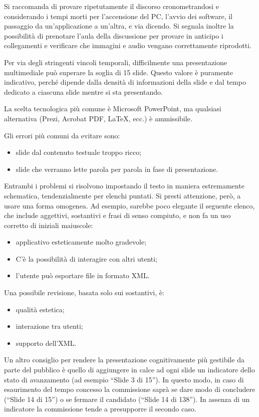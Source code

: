 Si raccomanda di provare ripetutamente il discorso cronometrandosi e considerando i tempi morti per l'accensione del PC, l'avvio dei software, il passaggio da un'applicazione a un'altra, e via dicendo. Si segnala inoltre la possibilità di prenotare l'aula della discussione per provare in anticipo i collegamenti e verificare che immagini e audio vengano correttamente riprodotti.

Per via degli stringenti vincoli temporali, difficilmente una presentazione multimediale può superare la soglia di 15 slide. Questo valore è puramente indicativo, perché dipende dalla densità di informazioni della slide e dal tempo dedicato a ciascuna slide mentre si sta presentando.

La scelta tecnologica più comune è Microsoft PowerPoint, ma qualsiasi alternativa (Prezi, Acrobat PDF, \LaTeX, ecc.) è ammissibile. 

Gli errori più comuni da evitare sono:
\begin{itemize}
	\item slide dal contenuto testuale troppo ricco;
	\item slide che verranno lette parola per parola in fase di presentazione.
\end{itemize}

Entrambi i problemi si risolvono impostando il testo in maniera estremamente schematica, tendenzialmente per elenchi puntati. Si presti attenzione, però, a usare una forma omogenea. 
Ad esempio, sarebbe poco elegante il seguente elenco, che include aggettivi, sostantivi e frasi di senso compiuto, e non fa un uso corretto di iniziali maiuscole:
\begin{itemize}
	\item applicativo esteticamente molto gradevole;
	\item C'è la possibilità di interagire con altri utenti;
	\item l'utente può esportare file in formato XML.
\end{itemize}

Una possibile revisione, basata solo sui sostantivi, è: 
\begin{itemize}
	\item qualità estetica;
	\item interazione tra utenti;
	\item supporto dell'XML.
\end{itemize}

Un altro consiglio per rendere la presentazione cognitivamente più gestibile da parte del pubblico è quello di aggiungere in calce ad ogni slide un indicatore dello stato di avanzamento (ad esempio ``Slide 3 di 15''). In questo modo, in caso di esaurimento del tempo concesso la commissione saprà se dare modo di concludere (``Slide 14 di 15'') o se fermare il candidato (``Slide 14 di 138''). In assenza di un indicatore la commissione tende a presupporre il secondo caso.

